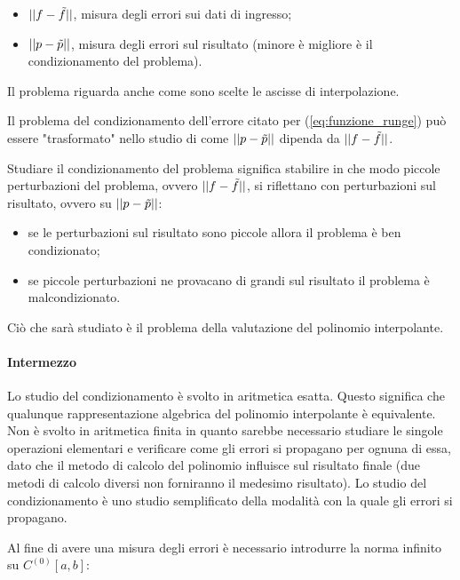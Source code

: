 \begin{itemize}
	\item $||f-\Tilde{f}||$, misura degli errori sui dati di ingresso;
	\item $||p-\Tilde{p}||$, misura degli errori sul risultato (minore è migliore è il condizionamento del problema).
\end{itemize}

Il problema riguarda anche come sono scelte le ascisse di interpolazione.

Il problema del condizionamento dell'errore citato per (\ref{eq:funzione_runge}) può essere "trasformato" nello studio di come $||p-\Tilde{p}||$ dipenda da $||f-\Tilde{f}||$. 

Studiare il condizionamento del problema significa stabilire in che modo piccole perturbazioni del problema, ovvero $||f-\Tilde{f}||$, si riflettano con perturbazioni sul risultato, ovvero su $||p-\Tilde{p}||$:
\begin{itemize}
    \item se le perturbazioni sul risultato sono piccole allora il problema è ben condizionato;
    \item se piccole perturbazioni ne provacano di grandi sul risultato il problema è malcondizionato.
\end{itemize}

Ciò che sarà studiato è il problema della valutazione del polinomio interpolante.

\paragraph{Intermezzo}{Lo studio del condizionamento è svolto in aritmetica esatta. Questo significa che qualunque rappresentazione algebrica del polinomio interpolante è equivalente. Non è svolto in aritmetica finita in quanto sarebbe necessario studiare le singole operazioni elementari e verificare come gli errori si propagano per ognuna di essa, dato che il metodo di calcolo del polinomio influisce sul risultato finale (due metodi di calcolo diversi non forniranno il medesimo risultato). Lo studio del condizionamento è uno studio semplificato della modalità con la quale gli errori si propagano.}

Al fine di avere una misura degli errori è necessario introdurre la norma infinito su $C^{(0)}[a,b]$:


